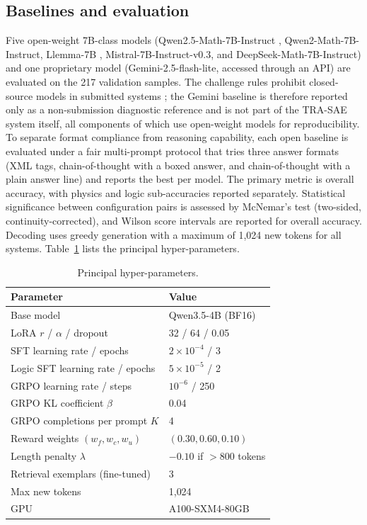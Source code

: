 \documentclass[APA,twocolumn]{USG}
\newcommand{\modelname}{TRA-SAE}
\newcommand{\basemodelname}{Qwen3.5-4B}
\begin{document}
\subsection{Baselines and evaluation}
Five open-weight 7B-class models (Qwen2.5-Math-7B-Instruct \citep{Yang2024},
Qwen2-Math-7B-Instruct, Llemma-7B \citep{Azerbayev2024},
Mistral-7B-Instruct-v0.3, and DeepSeek-Math-7B-Instruct) and one proprietary
model (Gemini-2.5-flash-lite, accessed through an API) are evaluated on the 217
validation samples. The challenge rules prohibit closed-source models in
submitted systems \citep{EXACT2026}; the Gemini baseline is therefore reported
only as a non-submission diagnostic reference and is not part of the
\modelname{} system itself, all components of which use
open-weight models for reproducibility. To separate format compliance from reasoning capability,
each open baseline is evaluated under a fair multi-prompt protocol that tries
three answer formats (XML tags, chain-of-thought with a boxed answer, and
chain-of-thought with a plain answer line) and reports the best per model. The
primary metric is overall accuracy, with physics and logic sub-accuracies
reported separately. Statistical significance between configuration pairs is
assessed by McNemar's test (two-sided, continuity-corrected), and Wilson score
intervals are reported for overall accuracy. Decoding uses greedy generation
with a maximum of 1{,}024 new tokens for all systems. Table~\ref{tab2} lists the
principal hyper-parameters.

\begin{table}[t]
\centering
\caption{Principal hyper-parameters.\label{tab2}}
\begin{tabular*}{\columnwidth}{@{\extracolsep\fill}ll@{\extracolsep\fill}}
\toprule
\textbf{Parameter} & \textbf{Value} \\
\midrule
Base model & \basemodelname{} (BF16) \\
LoRA $r$ / $\alpha$ / dropout & 32 / 64 / 0.05 \\
SFT learning rate / epochs & $2\times10^{-4}$ / 3 \\
Logic SFT learning rate / epochs & $5\times10^{-5}$ / 2 \\
GRPO learning rate / steps & $10^{-6}$ / 250 \\
GRPO KL coefficient $\beta$ & 0.04 \\
GRPO completions per prompt $K$ & 4 \\
Reward weights $(w_f,w_c,w_u)$ & $(0.30,0.60,0.10)$ \\
Length penalty $\lambda$ & $-0.10$ if ${>}800$ tokens \\
Retrieval exemplars (fine-tuned) & 3 \\
Max new tokens & 1{,}024 \\
GPU & A100-SXM4-80GB \\
\bottomrule
\end{tabular*}
\end{table}
\end{document}
